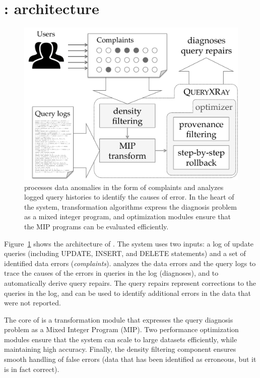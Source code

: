 \section{{\large\textbf{\sys}}: architecture}


\begin{figure}[t]
    \centering
        \includegraphics[scale=0.35]{figures/architecture}
    \caption{\sys processes data anomalies in the form of complaints and analyzes logged query histories to identify the causes of error. In the heart of the system, transformation algorithms express the diagnosis problem as a mixed integer program, and optimization modules ensure that the MIP programs can be evaluated efficiently.
    }
    \label{fig:architecture}
\end{figure}

Figure~\ref{fig:architecture} shows the architecture of \sys. The system uses
two inputs: a log of update queries (including UPDATE, INSERT, and DELETE
statements) and a set of identified data errors (\emph{complaints}). \sys
analyzes the data errors and the query logs to trace the causes of the errors
in queries in the log (diagnoses), and to automatically derive query repairs.
The query repairs represent corrections to the queries in the log, and can be
used to identify additional errors in the data that were not reported.

The core of \sys is a transformation module that expresses the query diagnosis
problem as a Mixed Integer Program (MIP). Two performance optimization modules
ensure that the system can scale to large datasets efficiently, while
maintaining high accuracy. Finally, the density filtering component ensures
smooth handling of false errors (data that has been identified as erroneous,
but it is in fact correct).




